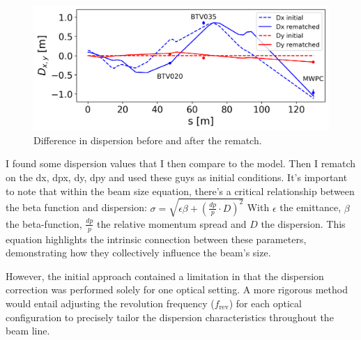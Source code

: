 \documentclass[a4paper,
               biblatex,     %
               ]{jacow}
\begin{document}
\begin{figure}[!htb]
   \centering
   \includegraphics*[width=1.0\columnwidth]{dispersion_diff.png}
   \caption{Difference in dispersion before and after the rematch.}
   \label{fig:dispersion}
\end{figure}

I found some dispersion values that I then compare to the model. Then I rematch on the dx, dpx, dy, dpy and used these guys as initial conditions. It's important to note that within the beam size equation, there's a critical relationship between the beta function and dispersion: $ \sigma = \sqrt{\epsilon \beta + \left(\frac{dp}{p}\cdot D\right)^{2}} $
With $\epsilon$ the emittance, $\beta$ the beta-function, $\frac{dp}{p}$ the relative momentum spread and $D$ the dispersion. This equation highlights the intrinsic connection between these parameters, demonstrating how they collectively influence the beam's size.

However, the initial approach contained a limitation in that the dispersion correction was performed solely for one optical setting. A more rigorous method would entail adjusting the revolution frequency ($f_{\text{rev}}$) for each optical configuration to precisely tailor the dispersion characteristics throughout the beam line.
\end{document}
